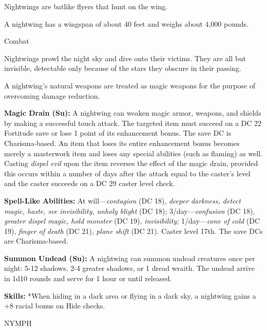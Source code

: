 \documentclass{article}
\begin{document}
\vspace{12pt}
Nightwings are batlike flyers that hunt on the wing.

A nightwing has a wingspan of about 40 feet and weighs about 4,000 pounds.

Combat

Nightwings prowl the night sky and dive onto their victims. They are all but invisible, 
detectable only because of the stars they obscure in their passing.

A nightwing's natural weapons are treated as magic weapons for the purpose of overcoming 
damage reduction.

\textbf{Magic Drain (Su):} A nightwing can weaken magic armor, weapons, and shields 
by making a successful touch attack. The targeted item must succeed on a DC 22 
Fortitude save or lose 1 point of its enhancement bonus. The save DC is Charisma-based. 
An item that loses its entire enhancement bonus becomes merely a masterwork item 
and loses any special abilities (such as flaming) as well. Casting \textit{dispel 
evil }upon the item reverses the effect of the magic drain, provided this occurs 
within a number of days after the attack equal to the caster's level and the caster 
succeeds on a DC 29 caster level check.

\textbf{Spell-Like Abilities:} At will---\textit{contagion }(DC 18), \textit{deeper 
darkness, detect magic, haste, see invisibility, unholy blight }(DC 18); 3/day---\textit{confusion 
}(DC 18), \textit{greater dispel magic, hold monster }(DC 19), \textit{invisibility; 
}1/day---\textit{cone of cold }(DC 19), \textit{finger of death }(DC 21), \textit{plane 
shift }(DC 21). Caster level 17th. The save DCs are Charisma-based.

\textbf{Summon Undead (Su):} A nightwing can summon undead creatures once per night: 
5-12 shadows, 2-4 greater shadows, or 1 dread wraith. The undead arrive in 1d10 
rounds and serve for 1 hour or until released.

\textbf{Skills:} *When hiding in a dark area or flying in a dark sky, a nightwing 
gains a +8 racial bonus on Hide checks.

\vspace{12pt}
{\LARGE{}NYMPH}
\end{document}
